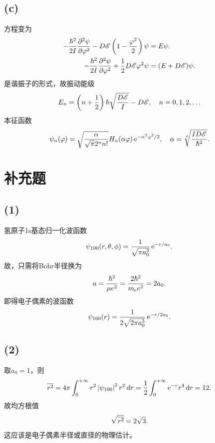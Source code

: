 	\subsection*{(c)}
	\Schr 方程变为 
	\begin{align}\notag
		-\frac{\hbar^2}{2I}\pv[2]\psi\vf-D\mathscr E\kh{1-\frac{\vf^2}2}\psi&=E\psi.\\
		-\frac{\hbar^2}{2I}\pv[2]\psi\vf+\frac12D\mathscr E\vf^2\psi&=(E+D\mathscr E)\psi.
	\end{align}
	是谐振子的形式，故振动能级
	\begin{align}
		E_n=\kh{n+\frac12}\hbar\sqrt{\frac{D\mathscr E}I}-D\mathscr E,\quad n=0,1,2,\ldots
	\end{align}
	本征函数 
	\begin{align}
		\psi_n(\vf)=\sqrt{\frac\alpha{\sqrt\pi 2^nn!}}H_n(\alpha\vf)\e{-\alpha^2\vf^2/2},\quad\alpha=\sqrt[4]{\frac{ID\mathscr E}{\hbar^2}}.
	\end{align}
	\section{补充题}
	\subsection*{(1)}
	氢原子1s基态归一化波函数
	\begin{align}
		\psi_{100}(r,\theta,\phi)=\frac1{\sqrt{\pi a_0^3}}\e{-r/a_0}.
	\end{align}
	故，只需将Bohr半径换为
	\begin{align}
		a=\frac{\hbar^2}{\mu e^2}=\frac{2\hbar^2}{m_\elc e^2}=2a_0.
	\end{align}
	即得电子偶素的波函数
	\begin{align}
		\psi_{100}(r)=\frac1{2\sqrt{2\pi a_0^3}}\e{-r/2a_0}.
	\end{align}
	\subsection*{(2)}
	取$a_0=1$，则 
	\begin{align}
		\avg{r^2}=4\pi\int\zti r^2\abs{\psi_{100}}^2r^2\d r=\frac12\int\zti\e{-r}r^4\d r=12.
	\end{align}
	故均方根值
	\begin{align}
		\sqrt{\avg{r^2}}=2\sqrt3.
	\end{align}
	这应该是电子偶素半径或直径的物理估计。
